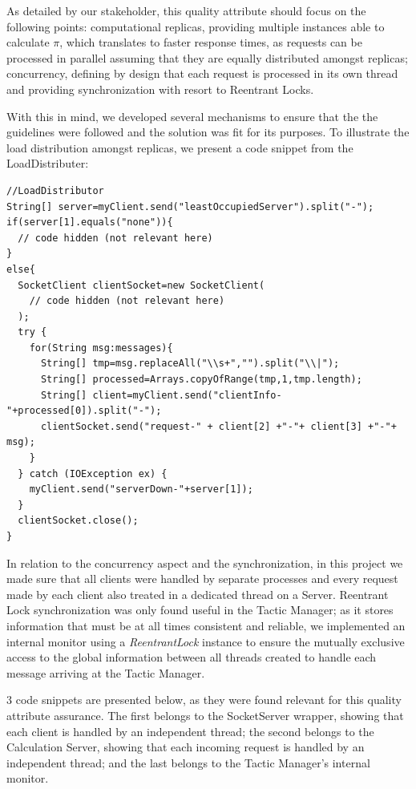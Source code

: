 \documentclass[12pt]{article}
\begin{document}
As detailed by our stakeholder, this quality attribute should focus on the following points:
computational replicas, providing multiple instances able to calculate $\pi$, which translates to faster response times, as requests can be processed in
parallel assuming that they are equally distributed amongst replicas;
concurrency, defining by design that each request is processed in its own thread and providing synchronization with resort to Reentrant Locks.

With this in mind, we developed several mechanisms to ensure that the the guidelines were followed and the solution was fit for its purposes.
To illustrate the load distribution amongst replicas, we present a code snippet from the LoadDistributer:

\begin{lstlisting}[label={loadDistributor}]
//LoadDistributor
String[] server=myClient.send("leastOccupiedServer").split("-");
if(server[1].equals("none")){
  // code hidden (not relevant here)
}
else{
  SocketClient clientSocket=new SocketClient(
    // code hidden (not relevant here)
  );
  try {
    for(String msg:messages){
      String[] tmp=msg.replaceAll("\\s+","").split("\\|");
      String[] processed=Arrays.copyOfRange(tmp,1,tmp.length);
      String[] client=myClient.send("clientInfo-"+processed[0]).split("-");
      clientSocket.send("request-" + client[2] +"-"+ client[3] +"-"+ msg);
    }
  } catch (IOException ex) {
    myClient.send("serverDown-"+server[1]);
  }
  clientSocket.close();
}
\end{lstlisting}

\newpage
In relation to the concurrency aspect and the synchronization, in this project we made sure that all clients were handled by separate processes and every request
made by each client also treated in a dedicated thread on a Server.
Reentrant Lock synchronization was only found useful in the Tactic Manager; as it stores information that must be at all times consistent and reliable, we
implemented an internal monitor using a \textit{ReentrantLock} instance to ensure the mutually exclusive access to the global information between all threads
created to handle each message arriving at the Tactic Manager.

3 code snippets are presented below, as they were found relevant for this quality attribute assurance.
The first belongs to the SocketServer wrapper, showing that each client is handled by an independent thread;
the second belongs to the Calculation Server, showing that each incoming request is handled by an independent thread;
and the last belongs to the Tactic Manager's internal monitor.
\end{document}
